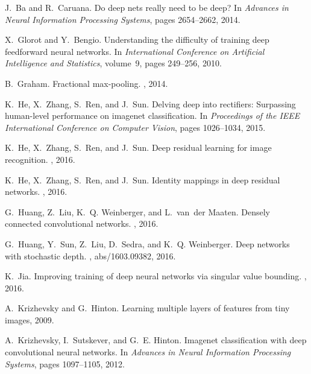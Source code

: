 \documentclass[10pt,onecolumn,letterpaper]{article}
\begin{document}
\begin{thebibliography}{10}\itemsep=-1pt

J.~Ba and R.~Caruana.
\newblock Do deep nets really need to be deep?
\newblock In {\em Advances in Neural Information Processing Systems}, pages
  2654--2662, 2014.

X.~Glorot and Y.~Bengio.
\newblock Understanding the difficulty of training deep feedforward neural
  networks.
\newblock In {\em International Conference on Artificial Intelligence and
  Statistics}, volume~9, pages 249--256, 2010.

B.~Graham.
\newblock Fractional max-pooling.
, 2014.

K.~He, X.~Zhang, S.~Ren, and J.~Sun.
\newblock Delving deep into rectifiers: Surpassing human-level performance on
  imagenet classification.
\newblock In {\em Proceedings of the IEEE International Conference on Computer
  Vision}, pages 1026--1034, 2015.

K.~He, X.~Zhang, S.~Ren, and J.~Sun.
\newblock Deep residual learning for image recognition.
, 2016.

K.~He, X.~Zhang, S.~Ren, and J.~Sun.
\newblock Identity mappings in deep residual networks.
, 2016.

G.~Huang, Z.~Liu, K.~Q. Weinberger, and L.~van~der Maaten.
\newblock Densely connected convolutional networks.
, 2016.

G.~Huang, Y.~Sun, Z.~Liu, D.~Sedra, and K.~Q. Weinberger.
\newblock Deep networks with stochastic depth.
, abs/1603.09382, 2016.

K.~Jia.
\newblock Improving training of deep neural networks via singular value
  bounding.
, 2016.

A.~Krizhevsky and G.~Hinton.
\newblock Learning multiple layers of features from tiny images, 2009.

A.~Krizhevsky, I.~Sutskever, and G.~E. Hinton.
\newblock Imagenet classification with deep convolutional neural networks.
\newblock In {\em Advances in Neural Information Processing Systems}, pages
  1097--1105, 2012.


\end{thebibliography}
\end{document}
